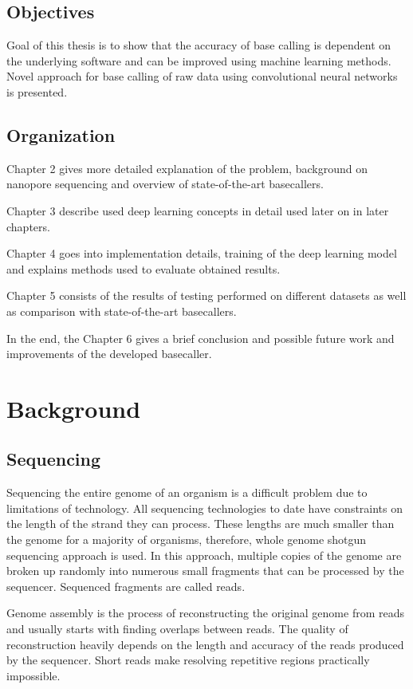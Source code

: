 \documentclass[times, utf8, diplomski, numeric, english]{fer}
\begin{document}
\section{Objectives}
Goal of this thesis is to show that the accuracy of base calling is dependent on the underlying software and can be improved using machine learning methods. Novel approach for base calling of raw data using convolutional neural networks is presented.

\section{Organization}
\indent Chapter 2 gives more detailed explanation of the problem, background on nanopore sequencing and overview of state-of-the-art basecallers.

Chapter 3 describe used deep learning concepts in detail used later on in later chapters.

Chapter 4 goes into implementation details, training of the deep learning model and explains methods used to evaluate obtained results. 

Chapter 5 consists of the results of testing performed on different datasets as well as comparison with state-of-the-art basecallers.

In the end, the Chapter 6 gives a brief conclusion and possible future work and improvements of the developed basecaller.

\chapter{Background}

\section{Sequencing}

Sequencing the entire genome of an organism is a difficult problem due to limitations of technology.
All sequencing technologies to date have constraints on the length of the strand they can process. 
These lengths are much smaller than the genome for a majority of organisms, therefore, whole genome shotgun sequencing approach is used. 
In this approach, multiple copies of the genome are broken up randomly into numerous small fragments that can be processed by the sequencer. Sequenced fragments are called reads.

Genome assembly is the process of reconstructing the original genome from reads and usually starts with finding overlaps between reads.
The quality of reconstruction heavily depends on the length and accuracy of the reads produced by the sequencer. Short reads make resolving repetitive regions practically impossible.
\end{document}
